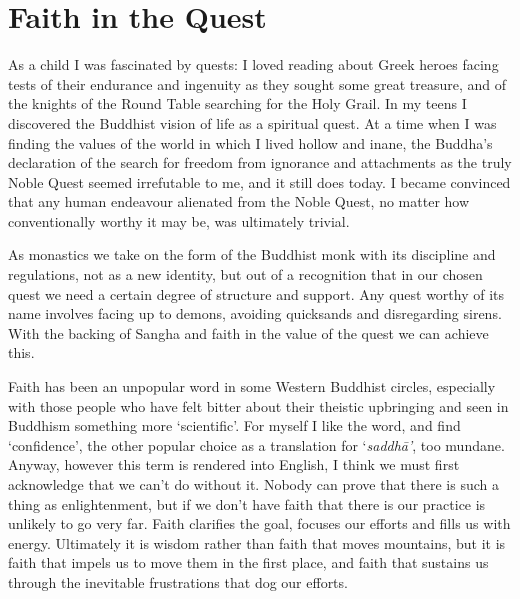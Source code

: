 

\chapter{Faith in the Quest}
\markright{\chapterAuthor}

As a child I was fascinated by quests: I loved reading about Greek
heroes facing tests of their endurance and ingenuity as they sought some
great treasure, and of the knights of the Round Table searching for the
Holy Grail. In my teens I discovered the Buddhist vision of life as a
spiritual quest. At a time when I was finding the values of the world in
which I lived hollow and inane, the Buddha's declaration of the search
for freedom from ignorance and attachments as the truly Noble Quest
seemed irrefutable to me, and it still does today. I became convinced
that any human endeavour alienated from the Noble Quest, no matter how
conventionally worthy it may be, was ultimately trivial.

As monastics we take on the form of the Buddhist monk with its
discipline and regulations, not as a new identity, but out of a
recognition that in our chosen quest we need a certain degree of
structure and support. Any quest worthy of its name involves facing up
to demons, avoiding quicksands and disregarding sirens. With the backing
of Sangha and faith in the value of the quest we can achieve this.

Faith has been an unpopular word in some Western Buddhist circles,
especially with those people who have felt bitter about their theistic
upbringing and seen in Buddhism something more `scientific'. For myself
I like the word, and find `confidence', the other popular choice as a
translation for `\emph{saddhā'}, too mundane. Anyway, however this term
is rendered into English, I think we must first acknowledge that we
can't do without it. Nobody can prove that there is such a thing as
enlightenment, but if we don't have faith that there is our practice is
unlikely to go very far. Faith clarifies the goal, focuses our efforts
and fills us with energy. Ultimately it is wisdom rather than faith that
moves mountains, but it is faith that impels us to move them in the
first place, and faith that sustains us through the inevitable
frustrations that dog our efforts.

